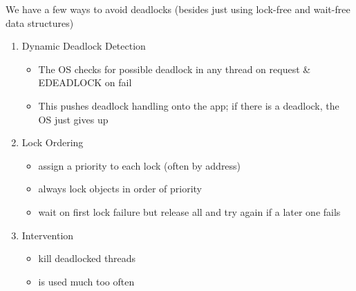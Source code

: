 \documentclass[../../lecture_notes.tex]{subfiles}
\begin{document}
We have a few ways to avoid deadlocks (besides just using lock-free and wait-free data structures)
\begin{enumerate}
\item Dynamic Deadlock Detection
\begin{itemize}
	\item The OS checks for possible deadlock in any thread on request \& EDEADLOCK on fail
	\item This pushes deadlock handling onto the app; if there is a deadlock, the OS just gives up
\end{itemize}
\item Lock Ordering
\begin{itemize}
	\item assign a priority to each lock (often by address)
	\item always lock objects in order of priority
	\item wait on first lock failure but release all and try again if a later one fails
\end{itemize}
\item Intervention
\begin{itemize}
	\item kill deadlocked threads
	\item is used much too often
\end{itemize}
\end{enumerate}
\end{document}

